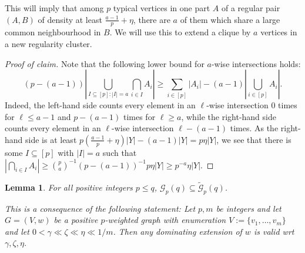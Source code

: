 \documentclass[10pt,a4paper]{article}
\newenvironment{poc}{\begin{proof}[Proof of claim]\renewcommand*{\qedsymbol}{$\blacksquare$}}{\end{proof}}
\newtheorem{lemma}[theorem]{Lemma}
\theoremstyle{definition}
\newcommand{\cG}{\mathcal{G}}
\begin{document}
This will imply that among $p$ typical vertices in one part $A$ of a regular pair $(A,B)$ of density at least $\frac{a-1}{p}+\eta$, there are $a$ of them which share a large common neighbourhood in $B$.
We will use this to extend a clique by $a$ vertices in a new regularity cluster.


\begin{poc}
	Note that the following lower bound for $a$-wise intersections holds:
	$$
	\textstyle{(p-(a-1))\left|\bigcup_{I \subseteq [p]:|I|=a}\bigcap_{i \in I}A_i\right| \geq \sum_{i \in [p]}|A_i|-(a-1)|\bigcup_{i \in [p]}A_i|}.
	$$
	Indeed, the left-hand side counts every element in an $\ell$-wise intersection $0$ times for $\ell\leq a-1$ and $p-(a-1)$ times for $\ell \geq a$, while the right-hand side counts every element in an $\ell$-wise intersection $\ell-(a-1)$ times.
	As the right-hand side is at least $p(\frac{a-1}{p}+\eta)|Y|-(a-1)|Y|=p\eta|Y|$, we see that there is some $I \subseteq [p]$ with $|I|=a$ such that $|\bigcap_{i \in I}A_i| \geq \binom{p}{a}^{-1}(p-(a-1))^{-1}p\eta|Y| \geq p^{-a}\eta|Y|$.
\end{poc}



\begin{lemma}\label{embedding}
	For all positive integers $p \leq q$, $\mathcal{G}_p(q) \subseteq \widetilde{\mathcal{G}}_p(q)$.
	
	\medskip
	This is a consequence of the following statement:
	Let $p,m$ be integers and let $G=(V,w)$ be a positive $p$-weighted graph with enumeration $V := \lbrace v_1,\ldots,v_m\rbrace$
	and let $0 < \gamma \ll \zeta \ll \eta \ll 1/m$. 
	Then any dominating extension of $w$ is valid wrt $\gamma,\zeta,\eta$. %
\end{lemma}
\end{document}
